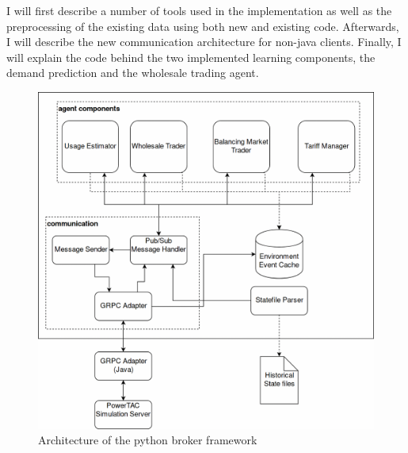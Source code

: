 I will first describe a number of tools used in the implementation as well as the preprocessing of the existing data
using both new and existing code. Afterwards,  I will describe the new communication architecture for non-java clients.
Finally, I will explain the code behind the two implemented learning components, the demand prediction and the wholesale
trading agent.


\begin{figure}[]
    \centering
    \includegraphics[width=0.8\linewidth]{img/Agent.png}
    \caption{Architecture of the python broker framework}
    \label{fig:agentframework}
\end{figure}


